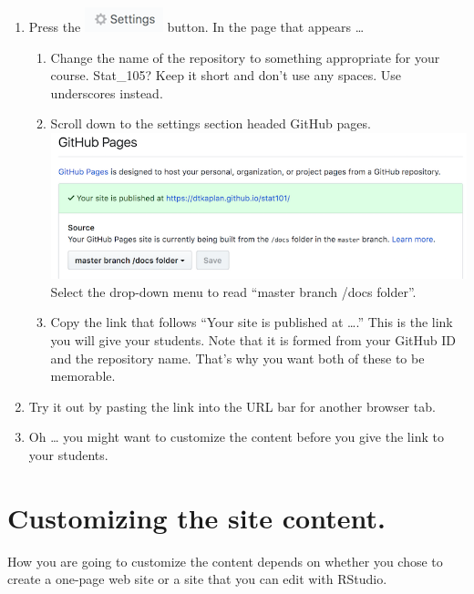 \documentclass[]{book}
\providecommand{\tightlist}{%
  \setlength{\itemsep}{0pt}\setlength{\parskip}{0pt}}
\theoremstyle{definition}
\theoremstyle{definition}
\theoremstyle{definition}
\theoremstyle{remark}
\begin{document}
\begin{enumerate}
\def\labelenumi{\arabic{enumi}.}
\setcounter{enumi}{3}
\item
  Press the \includegraphics{images/settings-github.png} button. In the
  page that appears \ldots{}

  \begin{enumerate}
  \def\labelenumii{\alph{enumii}.}
  \tightlist
  \item
    Change the name of the repository to something appropriate for your
    course. Stat\_105? Keep it short and don't use any spaces. Use
    underscores instead.
  \item
    Scroll down to the settings section headed GitHub pages.
    \includegraphics{images/gh-pages.png} Select the drop-down menu to
    read ``master branch /docs folder''.
  \item
    Copy the link that follows ``Your site is published at \ldots{}.''
    This is the link you will give your students. Note that it is formed
    from your GitHub ID and the repository name. That's why you want
    both of these to be memorable.
  \end{enumerate}
\item
  Try it out by pasting the link into the URL bar for another browser
  tab.
\item
  Oh \ldots{} you might want to customize the content before you give
  the link to your students.
\end{enumerate}

\section{Customizing the site
content.}\label{customizing-the-site-content.}

How you are going to customize the content depends on whether you chose
to create a one-page web site or a site that you can edit with RStudio.
\end{document}
